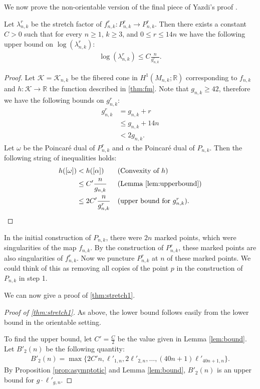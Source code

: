 We now prove the non-orientable version of the final piece of Yazdi's proof \cite[Lemma 3.6]{yazdi2018pseudo}.
\begin{lem}
\label{lem:bound}
Let $\lambda_{n,k}^r$ be the stretch factor of $f_{n,k}^r:P_{n,k}^r\rightarrow P_{n,k}^r$. Then there exists a constant $C > 0$ such that for every $n \geq 1$, $k \geq 3$, and $0 \leq r \leq 14n$ we have the following upper bound on $\log(\lambda_{n,k}^r)$:
\begin{align*}
  \log(\lambda^r_{n,k}) \leq C\frac{n}{g^r_{n,k}}.
\end{align*}
\end{lem}
\begin{proof}
  Let $\mathcal{K} = \mathcal{K}_{n,k}$ be the fibered cone in $H^1(M_{n,k};\mathbb{R})$ corresponding to $f_{n,k}$ and $h: \mathcal{K} \xrightarrow[]{} \mathbb{R}$
  the function described in \autoref{thm:fm}. Note that $g_{n,k}\geq 42$, therefore we have the following bounds on $g_{n,k}^r$:
  \begin{align*}
    g^r_{n,k} &= g_{n,k} + r \\
              &\leq g_{n,k} + 14n \\
              &< 2g_{n,k}.
  \end{align*}
  Let $\omega$ be the Poincar\'e dual of $P^r_{n,k}$ and $\alpha$ the Poincar\'e dual of $P_{n,k}$.  Then the following string of inequalities holds:
  \begin{align*}
    h([\omega]) &< h([\alpha]) &&\text{(Convexity of $h$)}\\
                &\leq C'\frac{n}{g_{n,k}} &&\text{(Lemma \ref{lem:upperbound})}\\
                &\leq 2C'\frac{n}{g^r_{n,k}}&&\text{(upper bound for $g_{n,k}^r$)}.\qedhere
  \end{align*}
\end{proof}


In the initial construction of $P_{n,k}$, there were $2n$  marked points, which were singularities of the map $f_{n,k}$.  By the construction of $P_{n,k}^r$, these marked points are also singularities of $f^r_{n,k}$.  Now we puncture $P_{n,k}^r$ at $n$ of these marked points.  We could think of this as removing all copies of the point $p$ in the construction of $P_{n,k}$ in step 1.

We can now give a proof of \autoref{thm:stretch1}.


\begin{proof}[Proof of \autoref{thm:stretch1}]
As above, the lower bound follows easily from the lower bound in the orientable setting.

  To find the upper bound, let $C'=\frac{C}{2}$ be the value given in Lemma \ref{lem:bound}. Let $B'_2(n)$ be the
  following quantity:
  \begin{align*}
    B'_2(n) = \max\{2C'n, \ell'_{1,n}, 2\ell'_{2,n}, \dots, (40n + 1)\ell'_{40n+1,n}\}.
  \end{align*}
  By Proposition \ref{prop:asymptotic} and Lemma \ref{lem:bound}, $B'_2(n)$ is an upper bound for $g\cdot \ell'_{g,n}$.
\end{proof}